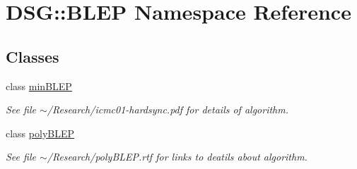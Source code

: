 \hypertarget{namespaceDSG_1_1BLEP}{\section{D\-S\-G\-:\-:B\-L\-E\-P Namespace Reference}
\label{namespaceDSG_1_1BLEP}
}
\subsection*{Classes}
\begin{DoxyCompactItemize}
\item 
class \hyperlink{classDSG_1_1BLEP_1_1minBLEP}{min\-B\-L\-E\-P}
\begin{DoxyCompactList}\small\item\em See file $\sim$/\-Research/icmc01-\/hardsync.pdf for details of algorithm. \end{DoxyCompactList}\item 
class \hyperlink{classDSG_1_1BLEP_1_1polyBLEP}{poly\-B\-L\-E\-P}
\begin{DoxyCompactList}\small\item\em See file $\sim$/\-Research/poly\-B\-L\-E\-P.rtf for links to deatils about algorithm. \end{DoxyCompactList}\end{DoxyCompactItemize}

